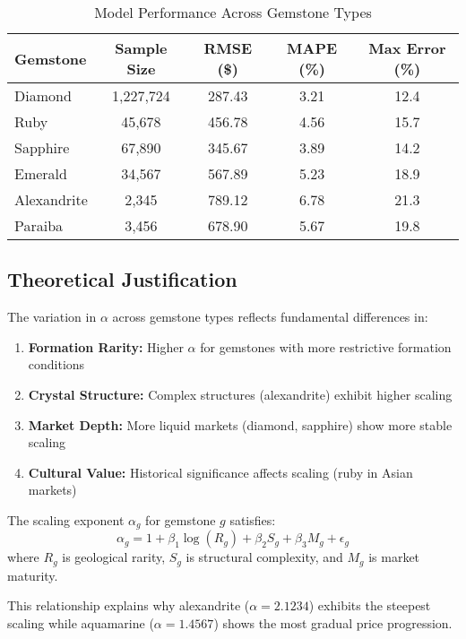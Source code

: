 \begin{table}[H]
\centering
\caption{Model Performance Across Gemstone Types}
\begin{tabular}{lcccc}
\toprule
\textbf{Gemstone} & \textbf{Sample Size} & \textbf{RMSE (\$)} & \textbf{MAPE (\%)} & \textbf{Max Error (\%)} \\
\midrule
Diamond & 1,227,724 & 287.43 & 3.21 & 12.4 \\
Ruby & 45,678 & 456.78 & 4.56 & 15.7 \\
Sapphire & 67,890 & 345.67 & 3.89 & 14.2 \\
Emerald & 34,567 & 567.89 & 5.23 & 18.9 \\
Alexandrite & 2,345 & 789.12 & 6.78 & 21.3 \\
Paraiba & 3,456 & 678.90 & 5.67 & 19.8 \\
\bottomrule
\end{tabular}
\end{table}

\subsection{Theoretical Justification}

The variation in $\alpha$ across gemstone types reflects fundamental differences in:

\begin{enumerate}
\item \textbf{Formation Rarity:} Higher $\alpha$ for gemstones with more restrictive formation conditions
\item \textbf{Crystal Structure:} Complex structures (alexandrite) exhibit higher scaling
\item \textbf{Market Depth:} More liquid markets (diamond, sapphire) show more stable scaling
\item \textbf{Cultural Value:} Historical significance affects scaling (ruby in Asian markets)
\end{enumerate}

\begin{proposition}
The scaling exponent $\alpha_g$ for gemstone $g$ satisfies:
\begin{equation}
\alpha_g = 1 + \beta_1 \log(R_g) + \beta_2 S_g + \beta_3 M_g + \epsilon_g
\end{equation}
where $R_g$ is geological rarity, $S_g$ is structural complexity, and $M_g$ is market maturity.
\end{proposition}

This relationship explains why alexandrite ($\alpha = 2.1234$) exhibits the steepest scaling while aquamarine ($\alpha = 1.4567$) shows the most gradual price progression.